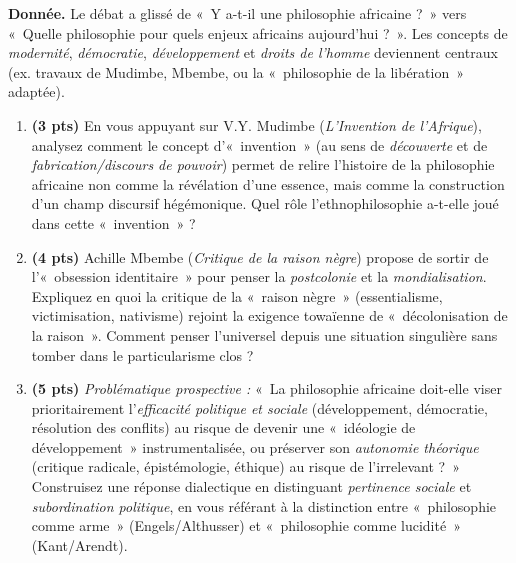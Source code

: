 \documentclass[11pt]{article}
\begin{document}
\begin{exercice}
\textbf{Donnée.} Le débat a glissé de «~Y a-t-il une philosophie africaine ?~» vers «~Quelle philosophie pour quels enjeux africains aujourd'hui ?~». Les concepts de \textit{modernité}, \textit{démocratie}, \textit{développement} et \textit{droits de l'homme} deviennent centraux (ex. travaux de Mudimbe, Mbembe, ou la «~philosophie de la libération~» adaptée).

\begin{enumerate}
    \item \textbf{(3 pts)} En vous appuyant sur V.Y. Mudimbe (\textit{L'Invention de l'Afrique}), analysez comment le concept d'«~invention~» (au sens de \textit{découverte} et de \textit{fabrication/discours de pouvoir}) permet de relire l'histoire de la philosophie africaine non comme la révélation d'une essence, mais comme la construction d'un champ discursif hégémonique. Quel rôle l'ethnophilosophie a-t-elle joué dans cette «~invention~» ?
    \item \textbf{(4 pts)} Achille Mbembe (\textit{Critique de la raison nègre}) propose de sortir de l'«~obsession identitaire~» pour penser la \textit{postcolonie} et la \textit{mondialisation}. Expliquez en quoi la critique de la «~raison nègre~» (essentialisme, victimisation, nativisme) rejoint la exigence towaïenne de «~décolonisation de la raison~». Comment penser l'universel depuis une situation singulière sans tomber dans le particularisme clos ?
    \item \textbf{(5 pts)} \textit{Problématique prospective :} «~La philosophie africaine doit-elle viser prioritairement l'\textit{efficacité politique et sociale} (développement, démocratie, résolution des conflits) au risque de devenir une «~idéologie de développement~» instrumentalisée, ou préserver son \textit{autonomie théorique} (critique radicale, épistémologie, éthique) au risque de l'irrelevant ?~» Construisez une réponse dialectique en distinguant \textit{pertinence sociale} et \textit{subordination politique}, en vous référant à la distinction entre «~philosophie comme arme~» (Engels/Althusser) et «~philosophie comme lucidité~» (Kant/Arendt).
\end{enumerate}
\end{exercice}
\end{document}
